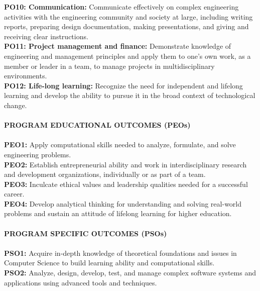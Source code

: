 \textbf{PO10: Communication:} Communicate effectively on complex engineering activities with the engineering community and society at large, including writing reports, preparing design documentation, making presentations, and giving and receiving clear instructions.\\
\textbf{PO11: Project management and finance:} Demonstrate knowledge of engineering and management principles and apply them to one's own work, as a member or leader in a team, to manage projects in multidisciplinary environments.\\
\textbf{PO12: Life-long learning:} Recognize the need for independent and lifelong learning and develop the ability to pursue it in the broad context of technological change.
\\
\\
\textbf{PROGRAM EDUCATIONAL OUTCOMES (PEOs)}
\\
\\
\textbf{PEO1:} Apply computational skills needed to analyze, formulate, and solve engineering problems.
\\
\textbf{PEO2:} Establish entrepreneurial ability and work in interdisciplinary research and development organizations, individually or as part of a team.
\\
\textbf{PEO3:} Inculcate ethical values and leadership qualities needed for a successful career.
\\
\textbf{PEO4:} Develop analytical thinking for understanding and solving real-world problems and sustain an attitude of lifelong learning for higher education.
\\
\\
\textbf{PROGRAM SPECIFIC OUTCOMES (PSOs)}
\\
\\
\textbf{PSO1:} Acquire in-depth knowledge of theoretical foundations and issues in Computer Science to build learning ability and computational skills.
\\
\textbf{PSO2:} Analyze, design, develop, test, and manage complex software systems and applications using advanced tools and techniques.
